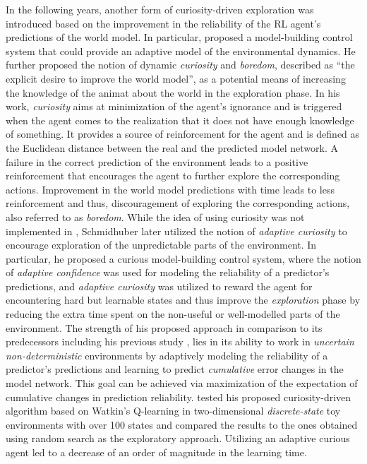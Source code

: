 In the following years, another form of curiosity-driven exploration was introduced  based on the improvement in the reliability of the RL agent's predictions of the world model. In particular,  proposed a model-building control system that could provide an adaptive model of the environmental dynamics. He further proposed the notion of dynamic \emph{curiosity} and \emph{boredom}, described as ``the explicit desire to improve the world model'', as a potential means of increasing the knowledge of the animat about the world in the exploration phase. In his work, \emph{curiosity} aims at minimization of the agent's ignorance and is triggered when the agent comes to the realization that it does not have enough knowledge of something. It provides a source of reinforcement for the agent and is defined as the Euclidean distance between the real and the predicted model network. A failure in the correct prediction of the environment leads to a positive reinforcement that encourages the agent to further explore the corresponding actions. Improvement in the world model predictions with time leads to less reinforcement and thus, discouragement of exploring the corresponding actions, also referred to as \emph{boredom}. 
While the idea of using curiosity was not implemented in , Schmidhuber later utilized the notion of \emph{adaptive curiosity}  to encourage exploration of the unpredictable parts of the environment. In particular, he proposed a curious model-building control system, where the notion of \emph{adaptive confidence} was used for modeling the reliability of a predictor's predictions, and \emph{adaptive curiosity} was utilized to reward the agent for encountering hard but learnable states and thus improve the \emph{exploration} phase by reducing the extra time spent on the non-useful or well-modelled parts of the environment. The strength of his proposed approach in comparison to its predecessors including his previous study , lies in its ability to work in \emph{uncertain non-deterministic} environments by adaptively modeling the reliability of a predictor's predictions and learning to predict \emph{cumulative} error changes in the model network. This goal can be achieved via maximization of the expectation of cumulative changes in prediction reliability.  tested his proposed curiosity-driven algorithm based on Watkin's Q-learning in two-dimensional \emph{discrete-state} toy environments with over 100 states and compared the results to the ones obtained using random search as the exploratory approach. Utilizing an adaptive curious agent led to a decrease of an order of magnitude in the learning time. 
